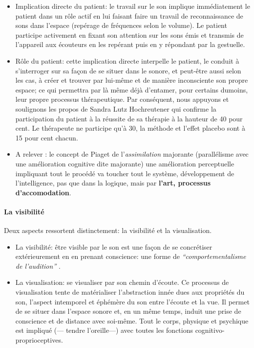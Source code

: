 \begin{itemize}
 \item Implication directe du
     patient: le travail sur le son implique immédiatement le patient
 dans un rôle actif en lui faisant faire un travail de reconnaissance de sons dans
 l'espace (repérage de fréquences selon le volume). Le patient
 participe activement en fixant son attention sur les
 sons émis et transmis de l'appareil aux écouteurs en les repérant
  puis en y
  répondant par la gestuelle.
  
  \item Rôle du patient: cette implication directe interpelle le patient, le conduit à
    s'interroger sur sa façon de 
    se situer dans le sonore, et  peut-être aussi selon les cas, à
    créer et trouver par lui-même et de manière
 inconsciente  
 son propre espace; ce  qui permettra par là même déjà d'entamer, pour certains dumoins, leur propre
 processus thérapeutique.
 Par conséquent, nous appuyons et soulignons  les propos de Sandra Lutz
 Hochreutener qui confirme la participation du patient à la réussite de sa thérapie à la hauteur de 
 40 pour cent. Le thérapeute ne participe qu'à 30, la
 méthode et l'effet placebo sont à 15 pour cent chacun.
 
  \item A relever : le concept de Piaget de l'\textit{assimilation} majorante (parallélisme avec une amélioration cognitive dite majorante)
une amélioration perceptuelle impliquant tout le procédé va toucher tout le
système, développement de l'intelligence, pas que dans la logique, mais
par \textbf{l'art, 
processus d'accomodation}.

  
\end{itemize}

\paragraph{La visibilité}

Deux aspects ressortent distinctement: la visibilité et la visualisation.
\begin{itemize}
 
\item La visibilité: être visible par le son est une façon de se concrétiser extérieurement en en prenant conscience: une forme de \textit{``comportementalisme de l'audition''} .


\item La visualisation: se visualiser par son chemin d'écoute.  
Ce processus de visualisation tente de matérialiser l'abstraction innée dues aux propriétés du son, l'aspect intemporel et éphémère du son entre l'écoute et la vue.
Il permet de se situer dans l'espace sonore et, en un même temps, induit une prise de conscience et de distance avec soi-même. Tout le corps, physique et psychique est impliqué (--- tendre l'oreille---) avec toutes les fonctions cognitivo-proprioceptives.

\end{itemize}

